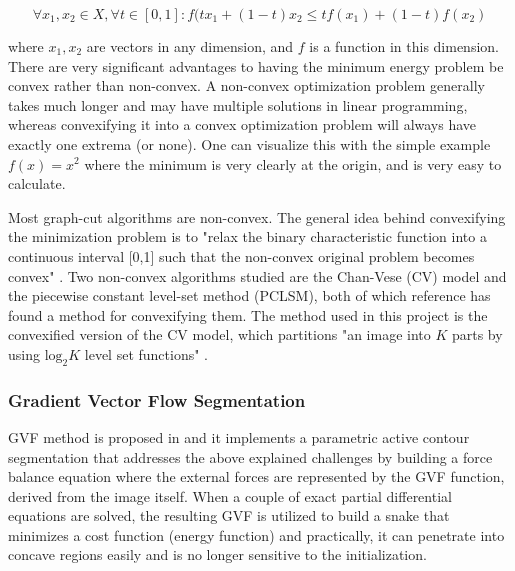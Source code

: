 \documentclass{article}
\begin{document}
\begin{equation}
\forall x_1,x_2 \in X, \forall t\in [0,1]: f(tx_1 + (1-t)x_2 \leq tf(x_1) + (1-t)f(x_2)
\label{eq:convex}
\end{equation}

where $x_1,x_2$ are vectors in any dimension, and $f$ is a function in this dimension. There are very significant advantages to having the minimum energy problem be convex rather than non-convex. A non-convex optimization problem generally takes much longer and may have multiple solutions in linear programming, whereas convexifying it into a convex optimization problem will always have exactly one extrema (or none). One can visualize this with the simple example $f(x)=x^2$ where the minimum is very clearly at the origin, and is very easy to calculate.

Most graph-cut algorithms are non-convex. The general idea behind convexifying the minimization problem is to "relax the binary characteristic function into a continuous interval [0,1] such that the non-convex original problem becomes convex" \cite{jun}. Two non-convex algorithms studied are the Chan-Vese (CV) model and the piecewise constant level-set method (PCLSM), both of which reference \cite{jun} has found a method for convexifying them. The method used in this project is the convexified version of the CV model, which partitions "an image into $K$ parts by using $\text{log}_2 K$ level set functions" \cite{jun}.






\subsubsection*{Gradient Vector Flow Segmentation}


GVF method is proposed in \cite{gvf} and it implements a parametric active contour segmentation that addresses the above explained challenges by building a force balance equation where the external forces are represented by the GVF function, derived from the image itself. When a couple of exact partial differential equations are solved, the resulting GVF is utilized to build a snake that minimizes a cost function (energy function) and practically, it can penetrate into concave regions easily and is no longer sensitive to the initialization.
\end{document}
